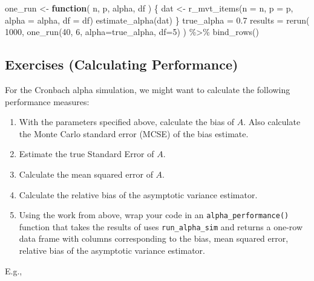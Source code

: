 \documentclass[
]{book}
\newenvironment{Shaded}{\begin{snugshade}}{\end{snugshade}}
\newcommand{\AttributeTok}[1]{\textcolor[rgb]{0.77,0.63,0.00}{#1}}
\newcommand{\ControlFlowTok}[1]{\textcolor[rgb]{0.13,0.29,0.53}{\textbf{#1}}}
\newcommand{\DecValTok}[1]{\textcolor[rgb]{0.00,0.00,0.81}{#1}}
\newcommand{\FloatTok}[1]{\textcolor[rgb]{0.00,0.00,0.81}{#1}}
\newcommand{\FunctionTok}[1]{\textcolor[rgb]{0.00,0.00,0.00}{#1}}
\newcommand{\NormalTok}[1]{#1}
\newcommand{\OtherTok}[1]{\textcolor[rgb]{0.56,0.35,0.01}{#1}}
\newcommand{\SpecialCharTok}[1]{\textcolor[rgb]{0.00,0.00,0.00}{#1}}
\begin{document}
\begin{Shaded}
\begin{Highlighting}[]
\NormalTok{one\_run }\OtherTok{\textless{}{-}} \ControlFlowTok{function}\NormalTok{( n, p, alpha, df ) \{}
\NormalTok{    dat }\OtherTok{\textless{}{-}} \FunctionTok{r\_mvt\_items}\NormalTok{(}\AttributeTok{n =}\NormalTok{ n, }\AttributeTok{p =}\NormalTok{ p, }\AttributeTok{alpha =}\NormalTok{ alpha, }\AttributeTok{df =}\NormalTok{ df)}
    \FunctionTok{estimate\_alpha}\NormalTok{(dat)}
\NormalTok{\}}
\NormalTok{true\_alpha }\OtherTok{=} \FloatTok{0.7}
\NormalTok{results }\OtherTok{=} \FunctionTok{rerun}\NormalTok{( }\DecValTok{1000}\NormalTok{, }\FunctionTok{one\_run}\NormalTok{(}\DecValTok{40}\NormalTok{, }\DecValTok{6}\NormalTok{, }\AttributeTok{alpha=}\NormalTok{true\_alpha, }\AttributeTok{df=}\DecValTok{5}\NormalTok{) ) }\SpecialCharTok{\%\textgreater{}\%}
  \FunctionTok{bind\_rows}\NormalTok{()}
\end{Highlighting}
\end{Shaded}

\hypertarget{exercises-calculating-performance}{%
\subsection{Exercises (Calculating Performance)}\label{exercises-calculating-performance}}

For the Cronbach alpha simulation, we might want to calculate the following performance measures:

\begin{enumerate}
\def\labelenumi{\arabic{enumi}.}
\item
  With the parameters specified above, calculate the bias of \(A\). Also calculate the Monte Carlo standard error (MCSE) of the bias estimate.
\item
  Estimate the true Standard Error of \(A\).
\item
  Calculate the mean squared error of \(A\).
\item
  Calculate the relative bias of the asymptotic variance estimator.
\item
  Using the work from above, wrap your code in an \texttt{alpha\_performance()} function that takes the results of uses \texttt{run\_alpha\_sim} and returns a one-row data frame with columns corresponding to the bias, mean squared error, relative bias of the asymptotic variance estimator.
\end{enumerate}

E.g.,
\end{document}

